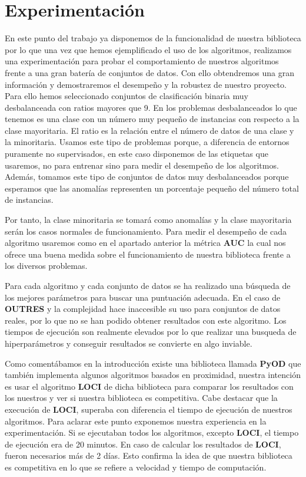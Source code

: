 \section{Experimentación}
En este punto del trabajo ya disponemos de la funcionalidad de nuestra biblioteca por lo que 
una vez que hemos ejemplificado el uso de los algoritmos, realizamos una experimentación 
para probar el comportamiento de nuestros algoritmos frente a 
una gran batería de conjuntos de datos. Con ello obtendremos una gran información y demostraremos 
el desempeño y la robustez de nuestro proyecto. Para ello hemos seleccionado conjuntos de clasificación 
binaria muy desbalanceada con ratios mayores que 9. En los problemas desbalanceados
lo que tenemos es una clase con un número muy pequeño de instancias con respecto
a la clase mayoritaria. El ratio es la relación entre el número de datos de una clase y
la minoritaria. Usamos este tipo de problemas porque, a diferencia de entornos puramente no
supervisados, en este caso disponemos de las etiquetas que usaremos, no para entrenar sino 
para medir el desempeño de los algoritmos. Además, tomamos este tipo de conjuntos de datos 
muy desbalanceados porque esperamos que las anomalías representen un porcentaje pequeño del 
número total de instancias.


Por tanto, la clase minoritaria se tomará como 
anomalías y la clase mayoritaria serán los casos normales de funcionamiento. 
Para medir el desempeño de cada algoritmo usaremos como en el apartado anterior la 
métrica \textbf{AUC} la cual nos ofrece una buena medida sobre el funcionamiento  
de nuestra biblioteca frente a los diversos problemas. 

Para cada algoritmo y cada conjunto de datos se ha realizado una búsqueda de los mejores
parámetros para buscar una puntuación adecuada. En el caso de \textbf{OUTRES}  y la 
complejidad hace inaccesible su uso para conjuntos de datos reales, por lo que no se 
han podido obtener resultados con este algoritmo. Los tiempos de ejecución son realmente
elevados por lo que realizar una busqueda de hiperparámetros y conseguir resultados se
convierte en algo inviable.



Como comentábamos en la introducción existe una biblioteca llamada \textbf{PyOD} 
\cite{zhaoPyODPythonToolbox2019} \cite{zhaoPythonToolboxScalable2019} 
que también implementa algunos algoritmos basados en proximidad, nuestra intención es usar el 
algoritmo \textbf{LOCI} \cite{papadimitriouLOCIFastOutlier2003} de dicha biblioteca  
para comparar los resultados con los nuestros y ver si nuestra biblioteca es competitiva.
Cabe destacar que la execución de \textbf{LOCI}, superaba con diferencia el tiempo de ejecución
de nuestros algoritmos. Para aclarar este punto exponemos nuestra experiencia en la 
experimentación. Si se ejecutaban todos los algoritmos, excepto \textbf{LOCI}, el tiempo de ejecución
era de 20 minutos. En caso de calcular los resultados de \textbf{LOCI}, fueron necesarios más de 2
días.
Esto confirma la idea de que nuestra biblioteca es competitiva en lo que se refiere a velocidad
y tiempo de computación.


